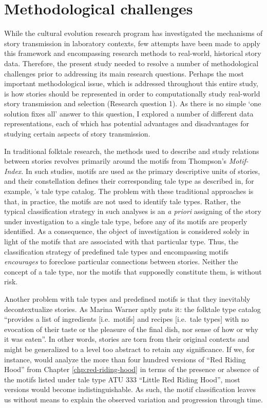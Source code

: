 \section[methodological challenges]{Methodological challenges}

While the cultural evolution research program has investigated the mechanisms of story transmission in laboratory contexts\autocite{mesoudiwhiten:2008}, few attempts have been made to apply this framework and encompassing research methods to real-world, historical story data\autocite[Notable exceptions are:][]{tehrani:2013,daSilva:2016}. Therefore, the present study needed to resolve a number of methodological challenges prior to addressing its main research questions. Perhaps the most important methodological issue, which is addressed throughout this entire study, is how stories should be represented in order to computationally study real-world story transmission and selection (Research question 1). As there is no simple `one solution fixes all' answer to this question, I explored a number of different data representations, each of which has potential advantages and disadvantages for studying certain aspects of story transmission. 

In traditional folktale research, the methods used to describe and study relations between stories revolves primarily around the motifs from Thompson's \emph{Motif-Index}\autocite{thompson:1955}. In such studies, motifs are used as the primary descriptive units of stories, and their constellation defines their corresponding tale type as described in, for example, \citeauthor{uther:2004}'s tale type catalog\autocite{uther:2004}. The problem with these traditional approaches is that, in practice, the motifs are not used to identify tale types. Rather, the typical classification strategy in such analyses is an \emph{a priori} assigning of the story under investigation to a single tale type, before any of its motifs are properly identified. As a consequence, the object of investigation is considered solely in light of the motifs that are associated with that particular type. Thus, the classification strategy of predefined tale types and encompassing motifs \emph{encourages} to foreclose particular connections between stories. Neither the concept of a tale type, nor the motifs that supposedly constitute them, is without risk. 

Another problem with tale types and predefined motifs is that they inevitably decontextualize stories. As Marina Warner aptly puts it: the folktale type catalog ``provides a list of ingredients [i.e.\ motifs] and recipes [i.e.\ tale types] with no evocation of their taste or the pleasure of the final dish, nor sense of how or why it was eaten''\autocite[XVIII]{warner:1995}. In other words, stories are torn from their original contexts and might be generalized to a level too abstract to retain any significance. If we, for instance, would analyze the more than four hundred versions of ``Red Riding Hood'' from Chapter \ref{chp:red-riding-hood} in terms of the presence or absence of the motifs listed under tale type ATU 333 ``Little Red Riding Hood'', most versions would become indistinguishable. As such, the motif classification leaves us without means to explain the observed variation and progression through time.

